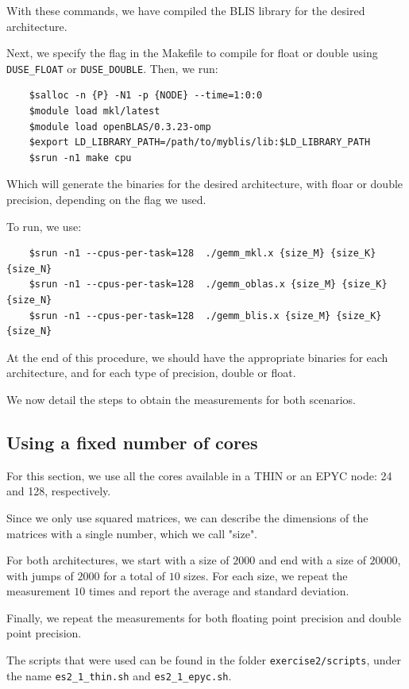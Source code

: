 \documentclass{report}
\begin{document}
With these commands, we have compiled the BLIS library for the desired 
architecture.

Next, we specify the flag in the Makefile to compile for float or double using 
\texttt{\-DUSE\_FLOAT} or \texttt{\-DUSE\_DOUBLE}. Then, we run:
\begin{verbatim}
    $salloc -n {P} -N1 -p {NODE} --time=1:0:0
    $module load mkl/latest
    $module load openBLAS/0.3.23-omp
    $export LD_LIBRARY_PATH=/path/to/myblis/lib:$LD_LIBRARY_PATH
    $srun -n1 make cpu
\end{verbatim}
Which will generate the binaries for the desired architecture, with floar or 
double precision, depending on the flag we used.

To run, we use: 
\begin{verbatim}
    $srun -n1 --cpus-per-task=128  ./gemm_mkl.x {size_M} {size_K} {size_N}
    $srun -n1 --cpus-per-task=128  ./gemm_oblas.x {size_M} {size_K} {size_N}
    $srun -n1 --cpus-per-task=128  ./gemm_blis.x {size_M} {size_K} {size_N}
\end{verbatim}

At the end of this procedure, we should have the appropriate binaries for each 
architecture, and for each type of precision, double or float.

We now detail the steps to obtain the measurements for both scenarios.

\subsection{Using a fixed number of cores}

For this section, we use all the cores available in a THIN or an EPYC node: 24 
and 128, respectively. 

Since we only use squared matrices, we can describe the dimensions of the matrices 
with a single number, which we call "size". 

For both architectures, we start with a size of $2000$ and end with a size of 
$20000$, with jumps of $2000$ for a total of $10$ sizes. For each size, 
we repeat the measurement $10$ times and report the average and standard 
deviation.

Finally, we repeat the measurements for both floating point precision and double 
point precision.

The scripts that were used can be found in the folder \texttt{exercise2/scripts}, 
under the name \texttt{es2\_1\_thin.sh} and \texttt{es2\_1\_epyc.sh}.
\end{document}
